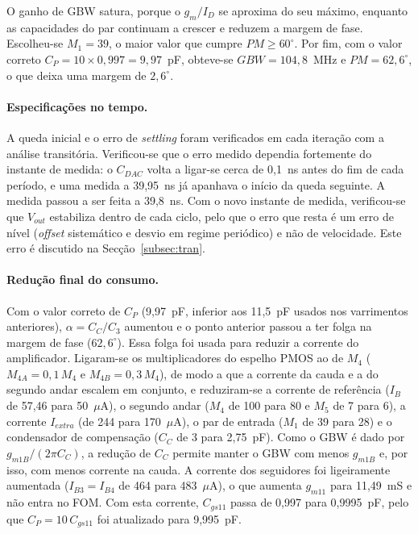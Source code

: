 O ganho de GBW satura, porque o $g_m/I_D$ se aproxima do seu máximo, enquanto as capacidades do par continuam a crescer
e reduzem a margem de fase. Escolheu-se $M_1 = 39$, o maior valor que cumpre $PM \ge 60^\circ$. Por fim, com o valor
correto $C_P = 10 \times 0{,}997 = 9{,}97$~pF, obteve-se $GBW = 104{,}8$~MHz e $PM = 62{,}6^\circ$, o que deixa uma
margem de $2{,}6^\circ$.

\paragraph{Especificações no tempo.}
A queda inicial e o erro de \textit{settling} foram verificados em cada iteração com a análise transitória. Verificou-se
que o erro medido dependia fortemente do instante de medida: o $C_{DAC}$ volta a ligar-se cerca de 0,1~ns antes do fim
de cada período, e uma medida a 39,95~ns já apanhava o início da queda seguinte. A medida passou a ser feita a 39,8~ns.
Com o novo instante de medida, verificou-se que $V_{out}$ estabiliza dentro de cada ciclo, pelo que o erro que resta é um
erro de nível (\textit{offset} sistemático e desvio em regime periódico) e não de velocidade. Este erro é discutido na
Secção~\ref{subsec:tran}.

\paragraph{Redução final do consumo.}
Com o valor correto de $C_P$ (9,97~pF, inferior aos 11,5~pF usados nos varrimentos anteriores), $\alpha = C_C/C_3$ aumentou
e o ponto anterior passou a ter folga na margem de fase ($62{,}6^\circ$). Essa folga foi usada para reduzir a corrente do
amplificador. Ligaram-se os multiplicadores do espelho PMOS ao de $M_4$ ($M_{4A} = 0{,}1\,M_4$ e $M_{4B} = 0{,}3\,M_4$), de
modo a que a corrente da cauda e a do segundo andar escalem em conjunto, e reduziram-se a corrente de referência
($I_B$ de 57,46 para 50~$\mu$A), o segundo andar ($M_4$ de 100 para 80 e $M_5$ de 7 para 6), a corrente $I_{extra}$
(de 244 para 170~$\mu$A), o par de entrada ($M_1$ de 39 para 28) e o condensador de compensação ($C_C$ de 3 para 2,75~pF).
Como o GBW é dado por $g_{m1B}/(2\pi C_C)$, a redução de $C_C$ permite manter o GBW com menos $g_{m1B}$ e, por isso, com menos
corrente na cauda. A corrente dos seguidores foi ligeiramente aumentada ($I_{B3} = I_{B4}$ de 464 para 483~$\mu$A), o que
aumenta $g_{m11}$ para 11,49~mS e não entra no FOM. Com esta corrente, $C_{gs11}$ passa de 0,997 para
0,9995~pF, pelo que $C_P = 10\,C_{gs11}$ foi atualizado para 9,995~pF.

